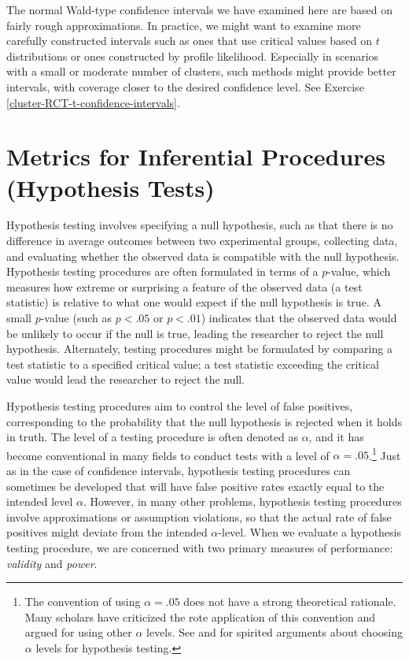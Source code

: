 \documentclass[
]{book}
\begin{document}
The normal Wald-type confidence intervals we have examined here are based on fairly rough approximations.
In practice, we might want to examine more carefully constructed intervals such as ones that use critical values based on \(t\) distributions or ones constructed by profile likelihood.
Especially in scenarios with a small or moderate number of clusters, such methods might provide better intervals, with coverage closer to the desired confidence level.
See Exercise \ref{cluster-RCT-t-confidence-intervals}.

\section{Metrics for Inferential Procedures (Hypothesis Tests)}\label{assessing-inferential-procedures}

Hypothesis testing involves specifying a null hypothesis, such as that there is no difference in average outcomes between two experimental groups, collecting data, and evaluating whether the observed data is compatible with the null hypothesis.
Hypothesis testing procedures are often formulated in terms of a \(p\)-value, which measures how extreme or surprising a feature of the observed data (a test statistic) is relative to what one would expect if the null hypothesis is true.
A small \(p\)-value (such as \(p < .05\) or \(p < .01\)) indicates that the observed data would be unlikely to occur if the null is true, leading the researcher to reject the null hypothesis.
Alternately, testing procedures might be formulated by comparing a test statistic to a specified critical value; a test statistic exceeding the critical value would lead the researcher to reject the null.

Hypothesis testing procedures aim to control the level of false positives, corresponding to the probability that the null hypothesis is rejected when it holds in truth.
The level of a testing procedure is often denoted as \(\alpha\), and it has become conventional in many fields to conduct tests with a level of \(\alpha = .05\).\footnote{The convention of using \(\alpha = .05\) does not have a strong theoretical rationale. Many scholars have criticized the rote application of this convention and argued for using other \(\alpha\) levels. See \citet{Benjamin2017redefine} and \citet{Lakens2018justify} for spirited arguments about choosing \(\alpha\) levels for hypothesis testing.}
Just as in the case of confidence intervals, hypothesis testing procedures can sometimes be developed that will have false positive rates exactly equal to the intended level \(\alpha\).
However, in many other problems, hypothesis testing procedures involve approximations or assumption violations, so that the actual rate of false positives might deviate from the intended \(\alpha\)-level.
When we evaluate a hypothesis testing procedure, we are concerned with two primary measures of performance: \emph{validity} and \emph{power}.
\end{document}
